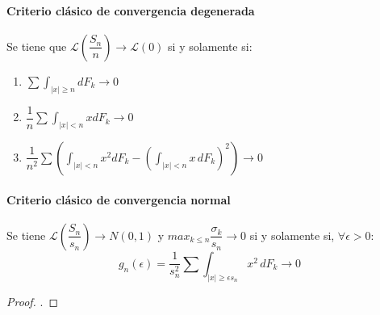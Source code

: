 \paragraph{Criterio clásico de convergencia degenerada}
Se tiene que $\mathcal{L} \left( \dfrac{S_n}{n} \right)\rightarrow \mathcal{L}(0)$ si y solamente si:
\begin{enumerate}
\item $\sum\displaystyle\int_{|x|\geq n}dF_k \rightarrow 0$
\item $\dfrac{1}{n}\sum\displaystyle\int_{|x|<n} x dF_k \rightarrow 0$
\item $\dfrac{1}{n^2}\sum\left( \displaystyle\int_{|x|<n}x^2 dF_k - \left(  \displaystyle\int_{|x|<n}x\, dF_k \right)^2 \right)\longrightarrow 0$
\end{enumerate}
\paragraph{Criterio clásico de convergencia normal}
Se tiene $\mathcal{L} \left( \dfrac{S_n}{s_n} \right)\rightarrow N(0,1)$ y $max_{k\leq n}\dfrac{\sigma_k}{s_n}\rightarrow 0$ si y solamente si, $\forall \epsilon >0$:
$$g_n(\epsilon)=\dfrac{1}{s_n^2}\sum\int_{|x|\geq \epsilon s_n}x^2\, dF_k\longrightarrow 0$$
\begin{proof}
.
\end{proof}
